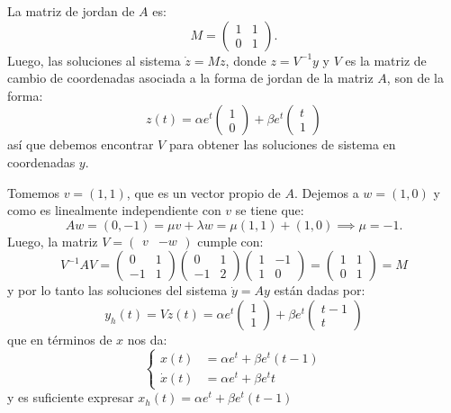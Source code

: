 \documentclass[10pt]{article}
\begin{document}
\begin{plist}
La matriz de jordan de \(A\) es:
\[
    M =
    \begin{pmatrix}
    1 & 1\\
    0 & 1
    \end{pmatrix}
.\]
Luego, las soluciones al sistema \(\dot{z} = M z\), donde \(z = V^{-1} y\) y
\(V\) es la matriz de cambio de coordenadas asociada a la forma de jordan de la
matriz \(A\), son de la forma:
\[
    z(t) =
    \alpha e^{t} \begin{pmatrix} 1 \\ 0 \end{pmatrix}
    +
    \beta e^{t} \begin{pmatrix} t \\ 1 \end{pmatrix}
\]
así que debemos encontrar \(V\) para obtener las soluciones de sistema en
coordenadas \(y\).

Tomemos \(v = (1,1)\), que es un vector propio de \(A\). Dejemos a \(w =
(1,0)\) y como es linealmente independiente con \(v\) se tiene que:
\[
    Aw
    =
    (0,-1)
    = \mu v + \lambda w
    = \mu (1,1) + (1,0)
    \implies
    \mu = -1.
\]
Luego, la matriz \(V = \begin{pmatrix} v & -w \end{pmatrix}\) cumple con:
\[
    V^{-1} A V
    =
    \begin{pmatrix}
    0 & 1\\
    -1 & 1
    \end{pmatrix}
    \begin{pmatrix}
    0 & 1\\
    -1 & 2
    \end{pmatrix}
    \begin{pmatrix}
    1 & -1\\
    1 & 0
    \end{pmatrix}
    =
    \begin{pmatrix}
    1 & 1\\
    0 & 1
    \end{pmatrix}
    =
    M
\]
y por lo tanto las soluciones del sistema \(\dot{y} = Ay\) están dadas por:
\[
    y_h(t)
    =
    Vz(t)
    =
    \alpha e^{t} \begin{pmatrix} 1 \\ 1 \end{pmatrix}
    +
    \beta e^{t} \begin{pmatrix} t-1 \\ t \end{pmatrix}
\]
que en términos de \(x\) nos da:
\[
\begin{cases}
    x(t) &= \alpha e^{t} + \beta e^{t} (t-1)\\
    \dot{x}(t) &= \alpha e^{t} + \beta e^{t} t
\end{cases}
\]
y es suficiente expresar \(x_h(t) = \alpha e^{t} + \beta e^{t}(t-1)\)


\end{plist}
\end{document}
